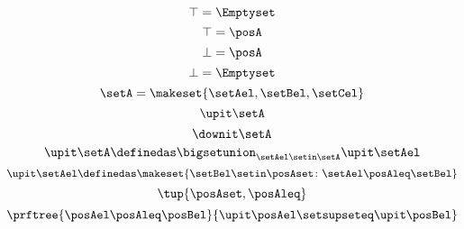 {\begin{forslides}
        \begin{equation*}
            \label{eq:designlecture-topa}
            \top=\Emptyset
        \end{equation*}
        \begin{equation*}
            \label{eq:designlecture-topb}
            \top=\posA
        \end{equation*}
        \begin{equation*}
            \label{eq:designlecture-bota}
            \bot=\posA
        \end{equation*}
        \begin{equation*}
            \label{eq:designlecture-botb}
            \bot=\Emptyset
        \end{equation*}
        \begin{equation*}
            \label{eq:designlecture-upa}
            \setA=\makeset{\setAel,\setBel,\setCel}
        \end{equation*}
        \begin{equation*}
            \label{eq:designlecture-upb}
            \upit \setA
        \end{equation*}
        \begin{equation*}
            \label{eq:designlecture-upc}
            \downit \setA
        \end{equation*}
        \begin{equation*}
            \label{eq:designlecture-upd}
            \upit \setA \definedas \bigsetunion_{\setAel \setin \setA}\upit \setAel
        \end{equation*}
        \begin{equation*}
            \label{eq:designlecture-upe}
            \upit \setAel \definedas \makeset{\setBel \setin \posAset \colon \setAel \posAleq \setBel}
        \end{equation*}
        \begin{equation*}
            \label{eq:designlecture-upf}
            \tup{\posAset,\posAleq}
        \end{equation*}
        \begin{equation*}
            \label{eq:designlecture-upg}
            \prftree{\posAel\posAleq \posBel}{\upit \posAel \setsupseteq \upit \posBel}
        \end{equation*}
    \end{forslides}

}